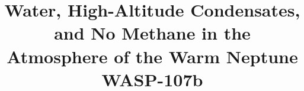 \documentclass[twocolumn]{aastex61}
\begin{document}
\title{Water, High-Altitude Condensates, and No Methane in the Atmosphere of the Warm Neptune WASP-107b}


\end{document}
